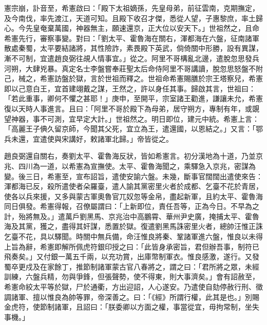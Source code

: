 \begin{pinyinscope}
 憲宗崩，訃音至，希憲啟曰：「殿下太祖嫡孫，先皇母弟，前征雲南，克期撫定，及今南伐，率先渡江，天道可知。且殿下收召才傑，悉從人望，子惠黎庶，率土歸心。今先皇奄棄萬國，神器無主，願速還京，正大位以安天下。」世祖然之，且命希憲先行，審察事變。對曰：「劉太平、霍魯海在關右，渾都海在六盤，征南諸軍散處秦蜀，太平要結諸將，其性險詐，素畏殿下英武，倘倚關中形勝，設有異謀，漸不可制，宜遣趙良弼往覘人情事宜。」從之。阿里不哥構亂北邊，遣脫忽思發兵河朔，大肆兇暴。真定名士李盤嘗奉莊聖太后命侍阿里不哥講讀，脫忽思怒盤不附己，械之，希憲訪盤於獄，言於世祖而釋之。世祖命希憲賜膳於宗王塔察兒，希憲即以己意白王，宜首建翊戴之謀，王然之，許以身任其事。歸啟其言，世祖曰：「若此重事，卿何不懼之甚耶！」庚申，至開平，宗室諸王勸進，謙讓未允，希憲復以天時人事進言。且曰：「阿里不哥於殿下為母弟，居守朔方，專制有年，或覬望神器，事不可測，宜早定大計。」世祖然之。明日即位，建元中統。希憲上言：「高麗王子倎久留京師，今聞其父死，宜立為王，遣還國，以恩結之。」又言：「鄂兵未還，宜遣使與宋講好，敕諸軍北歸。」帝皆從之。



 趙良弼還自關右，奏劉太平、霍魯海反狀，皆如希憲言。初分漢地為十道，乃並京兆、四川為一道，以希憲為宣撫使。太平、霍魯海聞之，乘驛急入京兆，密謀為變。後三日，希憲至，宣布詔旨，遣使安諭六盤。未幾，斷事官闊闊出遣使來告：渾都海已反，殺所遣使者朵羅臺，遣人諭其黨密里火者於成都、乞臺不花於青居，使各以兵來援，又多與蒙古軍奧魯官兀奴忽等金帛，盡起新軍，且約太平、霍魯海同日俱發。希憲得報，召僚屬謂曰：「上新即位，責任吾等，正為今日。不早為之計，殆將無及。」遣萬戶劉黑馬、京兆治中高鵬霄、華州尹史廣，掩捕太平、霍魯海及其黨，獲之，盡得其奸謀，悉置於獄。復遣劉黑馬誅密里火者，總帥汪惟正誅乞臺不花，具以驛聞。時關中無兵備，命汪惟良將秦、鞏諸軍進六盤，惟良以未得上旨為辭，希憲即解所佩虎符銀印授之曰：「此皆身承密旨，君但辦吾事，制符已飛奏矣。」又付銀一萬五千兩，以充功賞，出庫幣制軍衣。惟良感激，遂行。又發蜀卒更戍及在家餘丁，推節制諸軍蒙古官八春將之，謂之曰：「君所將之眾，未經訓練，六盤兵精，勿與爭鋒，但張聲勢，使不得東，則大事濟矣。」會有詔赦至，希憲命絞太平等於獄，尸於通衢，方出迎詔，人心遂安。乃遣使自劾停赦行刑、徵調諸軍、擅以惟良為帥等罪，帝深善之。曰：「《經》所謂行權，此其是也。」別賜金虎符，使節制諸軍，且詔曰：「朕委卿以方面之權，事當從宜，毋拘常制，坐失事機。」




\end{pinyinscope}
